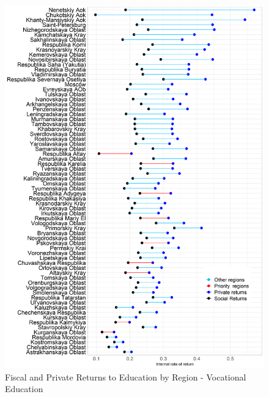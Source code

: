 \documentclass[alpha-refs]{wiley-article-05g}
\begin{document}
\begin{center}
	\begin{figure}[htbp!]
\begin{minipage}[b]{1\linewidth}
			\centering
			\includegraphics[scale=0.55]{returns_by_region_plot2.png}
		\end{minipage}
			\caption{Fiscal and Private Returns to Education by Region - 
			Vocational Education}\label{fig:1.3}
	\end{figure}


\end{center}
\end{document}
